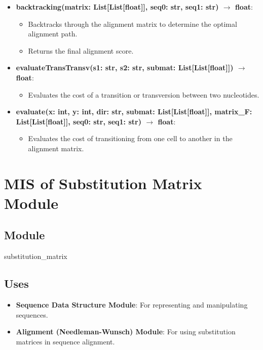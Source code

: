 \documentclass[12pt, titlepage]{article}
\begin{document}
\begin{itemize}
  \item \textbf{backtracking(matrix: List[List[float]], seq0: str, seq1: str) $\rightarrow$ float}:
  \begin{itemize}
      \item Backtracks through the alignment matrix to determine the optimal alignment path.
      \item Returns the final alignment score.
  \end{itemize}
  \item \textbf{evaluateTransTransv(s1: str, s2: str, submat: List[List[float]]) $\rightarrow$ float}:
  \begin{itemize}
      \item Evaluates the cost of a transition or transversion between two nucleotides.
  \end{itemize}
  \item \textbf{evaluate(x: int, y: int, dir: str, submat: List[List[float]], matrix\_F: List[List[float]], seq0: str, seq1: str) $\rightarrow$ float}:
  \begin{itemize}
      \item Evaluates the cost of transitioning from one cell to another in the alignment matrix.
  \end{itemize}
\end{itemize}

\newpage

\section{MIS of Substitution Matrix Module} \label{mSM}

\subsection{Module}

substitution\_matrix

\subsection{Uses}

\begin{itemize}
    \item \textbf{Sequence Data Structure Module}: For representing and manipulating sequences.
    \item \textbf{Alignment (Needleman-Wunsch) Module}: For using substitution matrices in sequence alignment.
\end{itemize}
\end{document}
